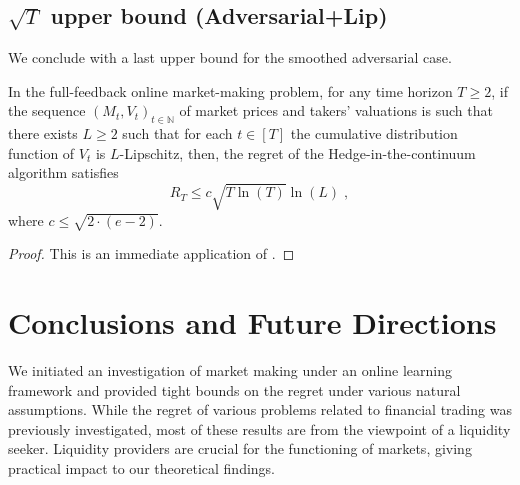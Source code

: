\documentclass[final,12pt]{colt2025}
\newcommand{\N}{\mathbb{N}}
\newcommand{\nP}{M}
\newcommand{\nZ}{V}
\begin{document}
\subsection{\texorpdfstring{$\sqrt{T}$}{√T} upper bound (Adversarial+Lip)}
We conclude with a last upper bound for the smoothed adversarial case. 
\begin{theorem}
\label{t:upper-bound-adv-smooth}
    In the full-feedback online market-making problem, 
    for any time horizon $T \ge 2$, if the sequence $(\nP_t,\nZ_t)_{t \in \N}$ of market prices and takers' valuations is such that there exists $L \ge 2$ such that for each $t \in [T]$ the cumulative distribution function of $\nZ_t$ is $L$-Lipschitz, then, the regret of the Hedge-in-the-continuum algorithm satisfies
    \[
        R_T
    \le
        c \sqrt{T \ln(T)} \ln(L) \;,
    \]
    where $c \le \sqrt{2\cdot (e-2)}$.
\end{theorem}
\begin{proof}
    This is an immediate application of \cite[Corollary 1 in Appendix A]{JMLR:v25:23-1627}.
\end{proof}

\fi


\section{Conclusions and Future Directions}
We initiated an investigation of market making under an online learning framework and provided tight bounds on the regret under various natural assumptions. 
While the regret of various problems related to financial trading was previously investigated, most of these results are from the viewpoint of a liquidity seeker. 
Liquidity providers are crucial for the functioning of markets, giving practical impact to our theoretical findings.
\end{document}
